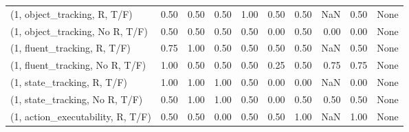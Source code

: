 \begin{table*}[h!]
\begin{adjustbox}{width=2\columnwidth,center}
\begin{tabular}{lrrr|rrr|rrr}
\midrule
(1, object\_tracking, R, T/F)         &                      0.50 &                  0.50 &                      0.50 &                          1.00 &                      0.50 &                          0.50 &                                    NaN &                               0.50 &                                  None \\
(1, object\_tracking, No R, T/F)      &                      0.50 &                  0.50 &                      0.50 &                          0.50 &                      0.00 &                          0.50 &                                   0.00 &                               0.00 &                                  None \\
(1, fluent\_tracking, R, T/F)         &                      0.75 &                  1.00 &                      0.50 &                          0.50 &                      0.50 &                          0.50 &                                    NaN &                               0.50 &                                  None \\
(1, fluent\_tracking, No R, T/F)      &                      1.00 &                  0.50 &                      0.50 &                          0.50 &                      0.25 &                          0.50 &                                   0.75 &                               0.75 &                                  None \\
(1, state\_tracking, R, T/F)          &                      1.00 &                  1.00 &                      1.00 &                          0.50 &                      0.00 &                          0.00 &                                    NaN &                               0.00 &                                  None \\
(1, state\_tracking, No R, T/F)       &                      0.50 &                  1.00 &                      1.00 &                          0.50 &                      0.00 &                          0.50 &                                   0.50 &                               0.50 &                                  None \\
(1, action\_executability, R, T/F)    &                      0.50 &                  0.50 &                      0.00 &                          0.50 &                      0.50 &                          1.00 &                                    NaN &                               1.00 &                                  None \\

\end{tabular}
\end{adjustbox}
\end{table*}
